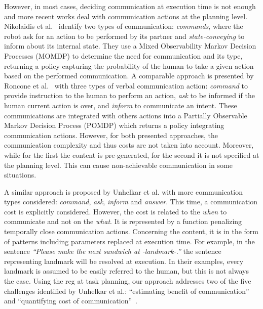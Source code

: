 However, in most cases, deciding communication at execution time is not enough and more recent works deal with communication actions at the planning level. Nikolaidis et al.~\cite{nikolaidis_2018_planning} identify two types of communication: \textit{commands}, where the robot ask for an action to be performed by its partner and \textit{state-conveying} to inform about its internal state. They use a Mixed Observability Markov Decision Processes (MOMDP) to determine the need for communication and its type, returning a policy capturing the probability of the human to take a given action based on the performed communication. A comparable approach is presented by Roncone et al.~\cite{roncone_2017_transparent} with three types of verbal communication action: \textit{command} to provide instruction to the human to perform an action, \textit{ask} to be informed if the human current action is over, and \textit{inform} to communicate an intent. These communications are integrated with others actions into a Partially Observable Markov Decision Process (POMDP) which returns a policy integrating communication actions. However, for both presented approaches, the communication complexity and thus costs are not taken into account. Moreover, while for the first the content is pre-generated, for the second it is not specified at the planning level. This can cause non-achievable communication in some situations.

A similar approach is proposed by Unhelkar et al. \cite{unhelkar_2020_decision} with more communication types considered: \textit{command}, \textit{ask}, \textit{inform} and \textit{answer}. This time, a communication cost is explicitly considered. However, the cost is related to the \textit{when} to communicate and not on the \textit{what}. It is represented by a function penalizing temporally close communication actions. Concerning the content, it is in the form of patterns including parameters replaced at execution time. For example, in the sentence \textit{“Please make the next sandwich at -landmark-.”} the sentence representing landmark will be resolved at execution. In their examples, every landmark is assumed to be easily referred to the human, but this is not always the case. Using the \acrshort{reg} at task planning, our approach addresses two of the five challenges identified by Unhelkar et al.: ``estimating benefit of communication'' and ``quantifying cost of communication''~\cite{unhelkar_2017_challenges}.

